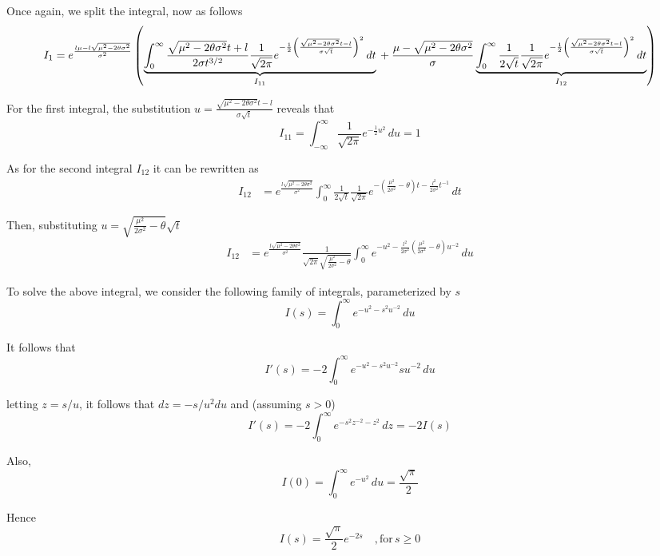 \documentclass[../Thesis.tex]{subfiles}
\begin{document}
Once again, we split the integral, now as follows
\begin{dmath*}
    I_1 = e^{\frac{l\mu - l \sqrt{\mu^2 - 2\theta \sigma^2}}{\sigma^2}} \left(\underbrace{\int_{0}^{\infty} \frac{\sqrt{\mu^2 - 2 \theta \sigma^2} t + l}{2 \sigma t^{3/2}} \frac{1}{\sqrt{2 \pi}} e^{-\frac{1}{2} \left( \frac{\sqrt{\mu^2 -  2\theta \sigma^2} t - l}{\sigma \sqrt{t}}\right)^2 } \, dt}_{I_{11}}  \\
    +  \frac{\mu - \sqrt{\mu^2 - 2\theta \sigma^2}}{\sigma} \underbrace{\int_{0}^{\infty} \frac{1}{2\sqrt{t}} \frac{1}{\sqrt{2 \pi}} e^{-\frac{1}{2} \left(\frac{\sqrt{\mu^2 -  2\theta \sigma^2} t - l}{\sigma \sqrt{t}}\right)^2 } \, dt}_{I_{12}}\right)
\end{dmath*}

For the first integral, the substitution $u = \frac{\sqrt{\mu^2 - 2\theta \sigma^2} t - l}{\sigma \sqrt{t}}$ reveals that
$$I_{11} = \int_{-\infty}^\infty \frac{1}{\sqrt{2\pi}} e^{-\frac{1}{2}u^2} \, du = 1$$

As for the second integral $I_{12}$ it can be rewritten as
\begin{align*}
    I_{12} & = e^{\frac{l\sqrt{\mu^2 - 2\theta \sigma^2} }{\sigma^2}} \int_{0}^{\infty} \frac{1}{2\sqrt{t}} \frac{1}{\sqrt{2 \pi}} e^{-\left(\frac{\mu^2}{2\sigma^2} - \theta \right) t - \frac{l^2}{2\sigma^2} t^{-1} } \, dt
\end{align*}

Then, substituting $u = \sqrt{\frac{\mu^2}{2\sigma^2} - \theta} \sqrt{t}$
\begin{align*}
    I_{12} & = e^{\frac{l\sqrt{\mu^2 - 2\theta \sigma^2} }{\sigma^2}} \frac{1}{\sqrt{2\pi} \sqrt{\frac{\mu^2}{2\sigma^2} - \theta}} \int_{0}^{\infty} e^{-u^2 - \frac{l^2}{2\sigma^2} \left(\frac{\mu^2}{2\sigma^2} - \theta\right) u^{-2}} \, du
\end{align*}

To solve the above integral, we consider the following family of integrals, parameterized by $s$
$$I(s) = \int_0^\infty e^{-u^2 - s^2 u^{-2}} \, du$$

It follows that
$$I'(s) = -2 \int_{0}^{\infty} e^{-u^2 - s^2 u^{-2}} s u^{-2} \, du $$

letting $z = s/u$, it follows that $dz = -s/u^2 du$ and (assuming $s > 0$)
$$I'(s) = -2 \int_{0}^{\infty} e^{- s^2 z^{-2} - z^2} \, dz = -2 I(s)$$

Also,
$$I(0) = \int_{0}^{\infty} e^{-u^2} \, du = \frac{\sqrt{\pi}}{2} $$

Hence
$$I(s) = \frac{\sqrt{\pi}}{2} e^{-2s} \quad , \text{for}\, s\geq 0$$
\end{document}
